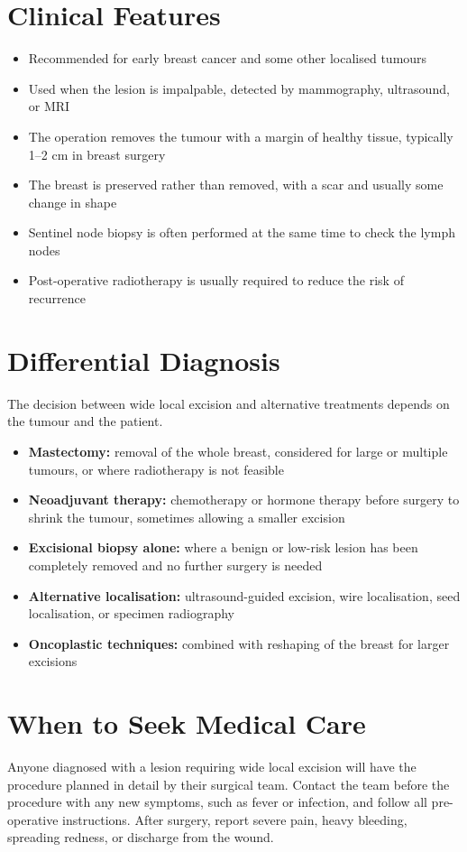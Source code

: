 \section*{Clinical Features}
\begin{itemize}
    \item Recommended for early breast cancer and some other localised tumours
    \item Used when the lesion is impalpable, detected by mammography, ultrasound, or MRI
    \item The operation removes the tumour with a margin of healthy tissue, typically 1--2 cm in breast surgery
    \item The breast is preserved rather than removed, with a scar and usually some change in shape
    \item Sentinel node biopsy is often performed at the same time to check the lymph nodes
    \item Post-operative radiotherapy is usually required to reduce the risk of recurrence
\end{itemize}

\section*{Differential Diagnosis}
The decision between wide local excision and alternative treatments depends on the tumour and the patient.
\begin{itemize}
    \item \textbf{Mastectomy:} removal of the whole breast, considered for large or multiple tumours, or where radiotherapy is not feasible
    \item \textbf{Neoadjuvant therapy:} chemotherapy or hormone therapy before surgery to shrink the tumour, sometimes allowing a smaller excision
    \item \textbf{Excisional biopsy alone:} where a benign or low-risk lesion has been completely removed and no further surgery is needed
    \item \textbf{Alternative localisation:} ultrasound-guided excision, wire localisation, seed localisation, or specimen radiography
    \item \textbf{Oncoplastic techniques:} combined with reshaping of the breast for larger excisions
\end{itemize}

\section*{When to Seek Medical Care}
Anyone diagnosed with a lesion requiring wide local excision will have the procedure planned in detail by their surgical team. Contact the team before the procedure with any new symptoms, such as fever or infection, and follow all pre-operative instructions. After surgery, report severe pain, heavy bleeding, spreading redness, or discharge from the wound.

